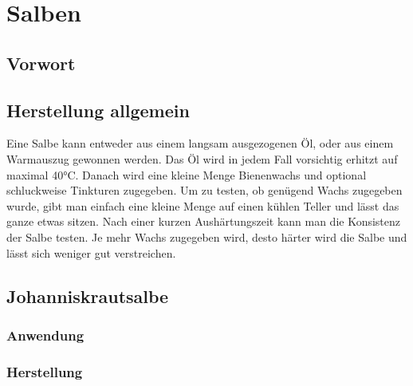 \chapter{Salben}

\section{Vorwort}


\lipsum[1-2]




\section{Herstellung allgemein}

Eine Salbe kann entweder aus einem langsam ausgezogenen Öl, oder aus einem Warmauszug gewonnen werden. Das Öl wird in jedem Fall vorsichtig erhitzt auf maximal 40°C. Danach wird eine kleine Menge Bienenwachs und optional schluckweise Tinkturen zugegeben. Um zu testen, ob genügend Wachs zugegeben wurde, gibt man einfach eine kleine Menge auf einen kühlen Teller und lässt das ganze etwas sitzen. Nach einer kurzen Aushärtungszeit kann man die Konsistenz der Salbe testen. Je mehr Wachs zugegeben wird, desto härter wird die Salbe und lässt sich weniger gut verstreichen.



\section{Johanniskrautsalbe}


     
               

\subsection{Anwendung}
\subsection{Herstellung}


